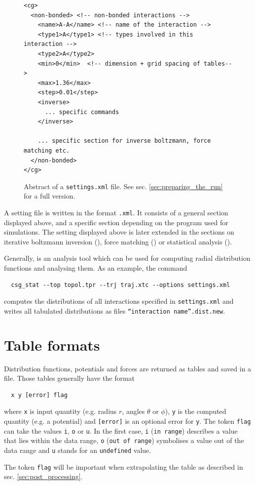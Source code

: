 \begin{figure}[h]
\centering
\begin{lstlisting}[frame=single]
<cg>
  <non-bonded> <!-- non-bonded interactions -->
    <name>A-A</name> <!-- name of the interaction -->
    <type1>A</type1> <!-- types involved in this interaction -->
    <type2>A</type2>
    <min>0</min>  <!-- dimension + grid spacing of tables-->
    <max>1.36</max>
    <step>0.01</step>
    <inverse>
      ... specific commands
    </inverse>

    ... specific section for inverse boltzmann, force matching etc.
  </non-bonded>
</cg>
\end{lstlisting}
\caption{Abstract of a \texttt{settings.xml} file. See sec. \ref{sec:preparing_the_run} for a full version.}
\end{figure}

A setting file is written in the format \texttt{.xml}. It consists of a general section displayed above, and a specific section depending on the program used for simulations. The setting displayed above is later extended in the sections on iterative boltzmann inversion (), force matching () or statistical analysis ().

Generally,  is an analysis tool which can be used for computing radial distribution functions and analysing them. As an example, the command

\begin{verbatim}
  csg_stat --top topol.tpr --trj traj.xtc --options settings.xml
\end{verbatim}

computes the distributions of all interactions specified in \texttt{settings.xml} and writes all tabulated distributions as files \texttt{``interaction name''.dist.new}.

\section{Table formats}
\label{sec:table_formats}
Distribution functions, potentials and forces are returned as tables and saved in a file. Those tables generally have the format
\begin{verbatim}
  x y [error] flag
\end{verbatim}
where \texttt{x} is input quantity (e.g. radius $r$, angles $\theta$ or $\phi$), \texttt{y} is the computed quantity (e.g. a potential) and \texttt{[error]} is an optional error for \texttt{y}. The token \texttt{flag} can take the values \texttt{i}, \texttt{o} or \texttt{u}.
In the first case, \texttt{i} (\texttt{in range}) describes a value that lies within the data range, \texttt{o} (\texttt{out of range}) symbolises a value out of the data range and \texttt{u} stands for an \texttt{undefined} value.

The token \texttt{flag} will be important when extrapolating the table as described in sec. \ref{sec:post_processing}.